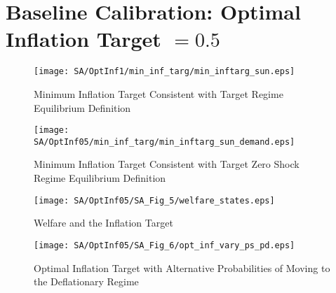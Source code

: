 \documentclass[11pt]{article}
\begin{document}
\section{Baseline Calibration: Optimal Inflation Target $=0.5$}
\begin{figure}[!htb]
	\begin{center}
		\caption{Minimum Inflation Target Consistent with Target Regime Equilibrium Definition}
		\texttt{[image: SA/OptInf1/min\_inf\_targ/min\_inftarg\_sun.eps]}\\
	\end{center}
\end{figure}
\begin{figure}[!htb]
	\begin{center}
		\caption{Minimum Inflation Target Consistent with Target Zero Shock Regime Equilibrium Definition}
		\texttt{[image: SA/OptInf05/min\_inf\_targ/min\_inftarg\_sun\_demand.eps]}\\
	\end{center}
\end{figure}
\begin{figure}[!htb]
	\begin{center}
		\caption{Welfare and the Inflation Target}
		\texttt{[image: SA/OptInf05/SA\_Fig\_5/welfare\_states.eps]}\\
	\end{center}
\end{figure}
\begin{figure}[!htb]
	\begin{center}
		\caption{Optimal Inflation Target with Alternative Probabilities of Moving to the Deflationary Regime}
		\texttt{[image: SA/OptInf05/SA\_Fig\_6/opt\_inf\_vary\_ps\_pd.eps]}\\
	\end{center}
\end{figure}

\newpage
\end{document}
